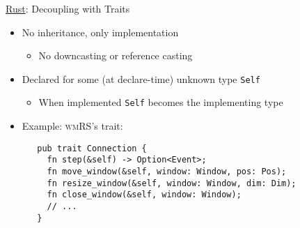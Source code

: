 \begin{frame}[fragile]{\underline{Rust}: Decoupling with Traits \hfill {\footnotesize \currentname}}


    \begin{itemize}

        \item No inheritance, only implementation\\
            \begin{itemize}
                \item No downcasting or reference casting
            \end{itemize}

        \item Declared for some (at declare-time) unknown type \texttt{Self}\\
            \begin{itemize}
                \item When implemented \texttt{Self} becomes the implementing type
            \end{itemize}

        \item Example: \textsc{wmRS}'s  trait:\\
\begin{verbatim}
   pub trait Connection {
     fn step(&self) -> Option<Event>;
     fn move_window(&self, window: Window, pos: Pos);
     fn resize_window(&self, window: Window, dim: Dim);
     fn close_window(&self, window: Window);
     // ...
   }
\end{verbatim}

    \end{itemize}

    \vfill

\end{frame}

